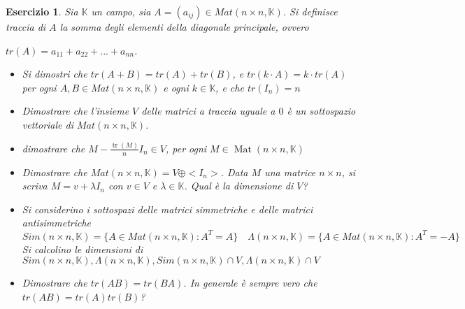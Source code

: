 \documentclass{article}
\newtheorem{es}{Esercizio}
\begin{document}
{\begin{es}
    Sia $\mathbb{K}$ un campo, sia $A=(a_{ij})\in Mat(n\times n,\mathbb{K})$. Si definisce traccia di $A$ la somma degli elementi della diagonale principale, ovvero
    \begin{center}
        $tr(A)=a_{11}+a_{22}+...+a_{nn}$.
    \end{center}
    \begin{itemize}
        \item Si dimostri che $tr(A+B)=tr(A)+tr(B)$, e $tr(k\cdot A)=k\cdot tr(A)$ per ogni $A,B\in Mat(n\times n,\mathbb{K})$ e ogni $k\in \mathbb{K}$, e che $tr(I_n)=n$
        \item Dimostrare che l'insieme $V$ delle matrici a traccia uguale a $0$ è un sottospazio vettoriale di $Mat(n\times n,\mathbb{K})$.
        \item dimostrare che $M-\frac{\operatorname{tr}(M)}{n}I_n\in V$, per ogni $M\in\operatorname{Mat}(n\times n,\mathbb{K})$
        \item Dimostrare che $Mat(n\times n,\mathbb{K})=V\oplus <I_n>$. Data $M$ una matrice $n\times n$, si scriva $M=v+\lambda I_n$ con $v\in V$ e $\lambda\in \mathbb{K}$. Qual è la dimensione di $V$?
        \item  Si considerino i sottospazi delle matrici simmetriche e delle matrici antisimmetriche  $$Sim(n\times n,\mathbb{K})=\{A\in Mat(n\times n,\mathbb{K}):A^T=A\}\quad \Lambda(n\times n,\mathbb{K})=\{A\in Mat(n\times n,\mathbb{K}):A^T=-A\}$$
        Si calcolino le dimensioni di $Sim(n\times n,\mathbb{K}),\Lambda(n\times n,\mathbb{K}),Sim(n\times n,\mathbb{K})\cap V, \Lambda(n\times n,\mathbb{K})\cap V$
        \item Dimostrare che $tr(AB)=tr(BA)$. In generale è sempre vero che $tr(AB)=tr(A)tr(B)$?
    \end{itemize}
\end{es}











}
\end{document}
